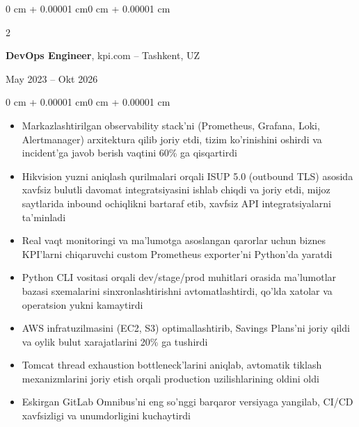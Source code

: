 \documentclass[10pt, letterpaper]{article}
\newenvironment{highlights}{
    \begin{itemize}[
        topsep=0.10 cm,
        parsep=0.10 cm,
        partopsep=0pt,
        itemsep=0pt,
        leftmargin=0 cm + 10pt
    ]
}{
    \end{itemize}
}
\newenvironment{onecolentry}{
    \begin{adjustwidth}{0 cm + 0.00001 cm}{0 cm + 0.00001 cm}
}{
    \end{adjustwidth}
}
\newenvironment{twocolentry}[2][]{
    \onecolentry
    \def\secondColumn{#2}
    \setcolumnwidth{\fill, 4.5 cm}
    \begin{paracol}{2}
}{
    \switchcolumn \raggedleft \secondColumn
    \end{paracol}
    \endonecolentry
}
\begin{document}
    \begin{twocolentry}{May 2023 -- Okt 2026}
        \textbf{DevOps Engineer}, kpi.com -- Tashkent, UZ
    \end{twocolentry}
    \vspace{0.10 cm}
    \begin{onecolentry}
        \begin{highlights}
            \item Markazlashtirilgan observability stack'ni (Prometheus, Grafana, Loki, Alertmanager) arxitektura qilib joriy etdi, tizim ko'rinishini oshirdi va incident'ga javob berish vaqtini 60\% ga qisqartirdi
            \item Hikvision yuzni aniqlash qurilmalari orqali ISUP 5.0 (outbound TLS) asosida xavfsiz bulutli davomat integratsiyasini ishlab chiqdi va joriy etdi, mijoz saytlarida inbound ochiqlikni bartaraf etib, xavfsiz API integratsiyalarni ta'minladi
            \item Real vaqt monitoringi va ma'lumotga asoslangan qarorlar uchun biznes KPI'larni chiqaruvchi custom Prometheus exporter'ni Python'da yaratdi
            \item Python CLI vositasi orqali dev/stage/prod muhitlari orasida ma'lumotlar bazasi sxemalarini sinxronlashtirishni avtomatlashtirdi, qo'lda xatolar va operatsion yukni kamaytirdi
            \item AWS infratuzilmasini (EC2, S3) optimallashtirib, Savings Plans'ni joriy qildi va oylik bulut xarajatlarini 20\% ga tushirdi
            \item Tomcat thread exhaustion bottleneck'larini aniqlab, avtomatik tiklash mexanizmlarini joriy etish orqali production uzilishlarining oldini oldi
            \item Eskirgan GitLab Omnibus'ni eng so'nggi barqaror versiyaga yangilab, CI/CD xavfsizligi va unumdorligini kuchaytirdi
        \end{highlights}
    \end{onecolentry}
    \vspace{0.20 cm}
    
\end{document}
